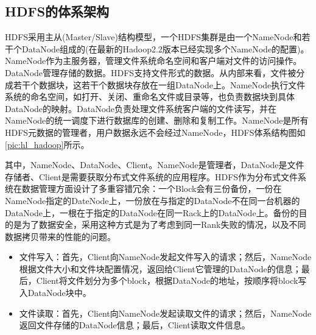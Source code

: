   \subsection{HDFS的体系架构}
  HDFS采用主从(Master/Slave)结构模型，一个HDFS集群是由一个NameNode和若干个DataNode组成的(在最新的Hadoop2.2版本已经实现多个NameNode的配置)。NameNode作为主服务器，管理文件系统命名空间和客户端对文件的访问操作。DataNode管理存储的数据。HDFS支持文件形式的数据。从内部来看，文件被分成若干个数据块，这若干个数据块存放在一组DataNode上。NameNode执行文件系统的命名空间，如打开、关闭、重命名文件或目录等，也负责数据块到具体DataNode的映射。DataNode负责处理文件系统客户端的文件读写，并在NameNode的统一调度下进行数据库的创建、删除和复制工作。NameNode是所有HDFS元数据的管理者，用户数据永远不会经过NameNode，HDFS体系结构图如\autoref{pic:hl_hadoop}所示。
  \begin{figure}
  \centering
    \label{pic:hl_hadoop}
  \end{figure}

  其中，NameNode、DataNode、Client。NameNode是管理者，DataNode是文件存储者、Client是需要获取分布式文件系统的应用程序。HDFS作为分布式文件系统在数据管理方面设计了多重容错冗余：一个Block会有三份备份，一份在NameNode指定的DateNode上，一份放在与指定的DataNode不在同一台机器的DataNode上，一根在于指定的DataNode在同一Rack上的DataNode上。备份的目的是为了数据安全，采用这种方式是为了考虑到同一Rank失败的情况，以及不同数据拷贝带来的性能的问题。
  \begin{itemize}
  \item 文件写入：首先，Client向NameNode发起文件写入的请求；然后，NameNode根据文件大小和文件块配置情况，返回给Client它管理的DataNode的信息；最后，Client将文件划分为多个block，根据DataNode的地址，按顺序将block写入DataNode块中。
  \item 文件读取：首先，Client向NameNode发起读取文件的请求；然后，NameNode返回文件存储的DataNode信息；最后，Client读取文件信息。
  \end{itemize}

